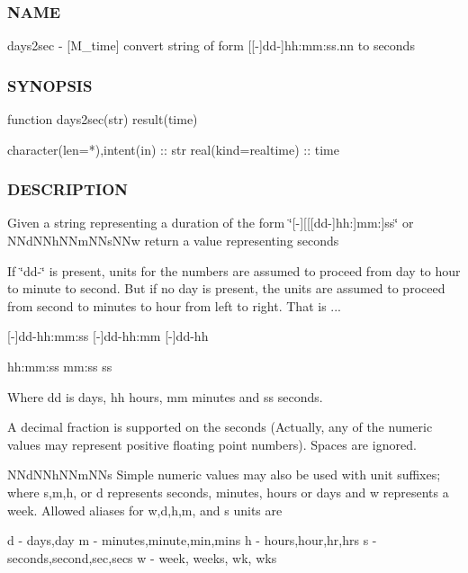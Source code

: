 \subsubsection*{N\+A\+ME}

days2sec -\/ \mbox{[}M\+\_\+time\mbox{]} convert string of form \mbox{[}\mbox{[}-\/\mbox{]}dd-\/\mbox{]}hh\+:mm\+:ss.\+nn to seconds 

\subsubsection*{S\+Y\+N\+O\+P\+S\+IS}

\begin{DoxyVerb}function days2sec(str) result(time)

 character(len=*),intent(in)       :: str
 real(kind=realtime)               :: time
\end{DoxyVerb}


\subsubsection*{D\+E\+S\+C\+R\+I\+P\+T\+I\+ON}

Given a string representing a duration of the form \char`\"{}\mbox{[}-\/\mbox{]}\mbox{[}\mbox{[}\mbox{[}dd-\/\mbox{]}hh\+:\mbox{]}mm\+:\mbox{]}ss\char`\"{} or N\+Nd\+N\+Nh\+N\+Nm\+N\+Ns\+N\+Nw return a value representing seconds

If \char`\"{}dd-\/\char`\"{} is present, units for the numbers are assumed to proceed from day to hour to minute to second. But if no day is present, the units are assumed to proceed from second to minutes to hour from left to right. That is ...

\mbox{[}-\/\mbox{]}dd-\/hh\+:mm\+:ss \mbox{[}-\/\mbox{]}dd-\/hh\+:mm \mbox{[}-\/\mbox{]}dd-\/hh

hh\+:mm\+:ss mm\+:ss ss

Where dd is days, hh hours, mm minutes and ss seconds.

A decimal fraction is supported on the seconds (Actually, any of the numeric values may represent positive floating point numbers). Spaces are ignored.

N\+Nd\+N\+Nh\+N\+Nm\+N\+Ns Simple numeric values may also be used with unit suffixes; where s,m,h, or d represents seconds, minutes, hours or days and w represents a week. Allowed aliases for w,d,h,m, and s units are \begin{DoxyVerb}             d -  days,day
             m -  minutes,minute,min,mins
             h -  hours,hour,hr,hrs
             s -  seconds,second,sec,secs
             w -  week, weeks, wk, wks
\end{DoxyVerb}


